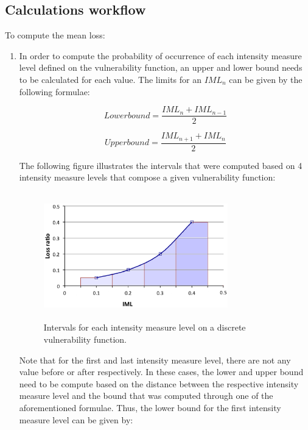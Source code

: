 \subsection{Calculations workflow}

To compute the mean loss:

\begin{enumerate}
\item In order to compute the probability of occurrence of each intensity measure level defined on the vulnerability function, an upper and lower bound needs to be calculated for each value. The limits for an $IML_n$ can be given by the following formulae:

\begin{equation}
Lower bound = \frac{IML_n+IML_{n-1}}{2}
\end{equation}

\begin{equation}
Upper bound = \frac{IML_{n+1}+IML_{n}}{2}
\end{equation}

The following figure illustrates the intervals that were computed based on 4 intensity measure levels that compose a given vulnerability function:

\begin{figure}[ht]
\centering
\includegraphics[width=8cm,height=5.5cm]{./Figures/Part_Risk/VF_intervals.eps}
\caption{Intervals for each intensity measure level on a discrete vulnerability function.}
\label{fig:VF_intervals}
\end{figure}

Note that for the first and last intensity measure level, there are not any value before or after respectively. In these cases, the lower and upper bound need to be compute based on the distance between the respective intensity measure level and the bound that was computed through one of the aforementioned formulae. Thus, the lower bound for the first intensity measure level can be given by:


\end{enumerate}
